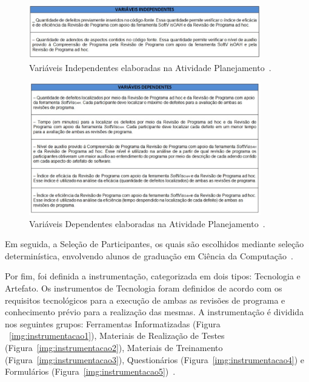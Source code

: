 \begin{figure}[!htb]
\centering
\includegraphics[width=0.9\textwidth]{images/tabelas-variaveis-independentes.png}
\caption{Variáveis Independentes elaboradas na Atividade Planejamento~\cite{d2012avaliaccao}.}
\label{img:independentes}
\end{figure}


\begin{figure}[!htb]
\centering
\includegraphics[width=0.9\textwidth]{images/tabelas-variaveis-dependentes.png}
\caption{Variáveis Dependentes elaboradas na Atividade Planejamento~\cite{d2012avaliaccao}.}
\label{img:dependentes}
\end{figure}


Em seguida, a Seleção de Participantes, os quais são escolhidos mediante seleção determinística, envolvendo alunos de graduação em Ciência da Computação~\cite{d2012avaliaccao}.

Por fim, foi definida a instrumentação, categorizada em dois tipos: Tecnologia e Artefato. Os instrumentos de Tecnologia foram definidos de acordo com os requisitos tecnológicos para a execução de ambas as revisões de programa e conhecimento prévio para a realização das mesmas. A instrumentação é dividida nos seguintes grupos: Ferramentas Informatizadas (Figura ~\ref{img:instrumentacao1}), Materiais de Realização de Testes (Figura~\ref{img:instrumentacao2}), Materiais de Treinamento (Figura~\ref{img:instrumentacao3}), Questionários (Figura~\ref{img:instrumentacao4}) e Formulários (Figura~\ref{img:instrumentacao5})~\cite{d2012avaliaccao}.


